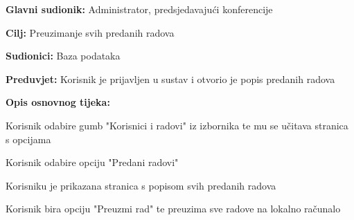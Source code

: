 					\noindent {}
					\begin{packed_item}
						\item \textbf{Glavni sudionik:} Administrator, predsjedavajući konferencije
						\item \textbf{Cilj:} Preuzimanje svih predanih radova
						\item \textbf{Sudionici:} Baza podataka
						\item \textbf{Preduvjet:} Korisnik je prijavljen u sustav i otvorio je popis predanih radova
						
						\item \textbf{Opis osnovnog tijeka:} 
						\item[] \begin{packed_enum}
							
							\item Korisnik odabire gumb "Korisnici i radovi" iz izbornika te mu se učitava stranica s opcijama
							\item Korisnik odabire opciju "Predani radovi" 
							\item Korisniku je prikazana stranica s popisom svih predanih radova
							\item Korisnik bira opciju "Preuzmi rad" te preuzima sve radove na lokalno računalo
							
							
						\end{packed_enum}
					\end{packed_item}


					\noindent {}
					
